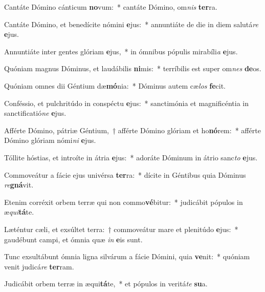 \item Cantáte Dómino cánticum \textbf{no}vum:~* cantáte Dómino, om\textit{nis} \textbf{ter}ra.
\item Cantáte Dómino, et benedícite nómini \textbf{e}jus:~* annuntiáte de die in diem salutá\textit{re} \textbf{e}jus.
\item Annuntiáte inter gentes glóriam \textbf{e}jus,~* in ómnibus pópulis mirabíli\textit{a} \textbf{e}jus.
\item Quóniam magnus Dóminus, et laudábilis \textbf{ni}mis:~* terríbilis est super om\textit{nes} \textbf{de}os.
\item Quóniam omnes dii Géntium dæ\textbf{mó}nia:~* Dóminus autem cæ\textit{los} \textbf{fe}cit.
\item Conféssio, et pulchritúdo in conspéctu \textbf{e}jus:~* sanctimónia et magnificéntia in sanctificatió\textit{ne} \textbf{e}jus.
\item Afférte Dómino, pátriæ Géntium,~† afférte Dómino glóriam et ho\textbf{nó}rem:~* afférte Dómino glóriam nómi\textit{ni} \textbf{e}jus.
\item Tóllite hóstias, et introíte in átria \textbf{e}jus:~* adoráte Dóminum in átrio sanc\textit{to} \textbf{e}jus.
\item Commoveátur a fácie ejus univérsa \textbf{ter}ra:~* dícite in Géntibus quia Dóminus \textit{re}\textbf{gná}vit.
\item Etenim corréxit orbem terræ qui non commo\textbf{vé}bitur:~* judicábit pópulos in æ\textit{qui}\textbf{tá}te.
\item Læténtur cæli, et exsúltet terra:~† commoveátur mare et plenitúdo \textbf{e}jus:~* gaudébunt campi, et ómnia quæ \textit{in} \textbf{e}is sunt.
\item Tunc exsultábunt ómnia ligna silvárum a fácie Dómini, quia \textbf{ve}nit:~* quóniam venit judicá\textit{re} \textbf{ter}ram.
\item Judicábit orbem terræ in æqui\textbf{tá}te,~* et pópulos in veritá\textit{te} \textbf{su}a.

